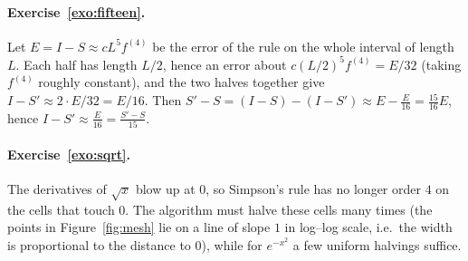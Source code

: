 \documentclass[11pt,a4paper,twoside,openright]{book}
\newcounter{exo}[chapter]
\begin{document}
\paragraph{Exercise~\ref{exo:fifteen}.}
Let $E=I-S\approx cL^{5}f^{(4)}$ be the error of the rule on the whole interval of length $L$. Each half has length $L/2$, hence an error about $c(L/2)^{5}f^{(4)}=E/32$ (taking $f^{(4)}$ roughly constant), and the two halves together give $I-S'\approx2\cdot E/32=E/16$. Then $S'-S=(I-S)-(I-S')\approx E-\frac E{16}=\frac{15}{16}E$, hence $I-S'\approx\frac E{16}=\frac{S'-S}{15}$.

\paragraph{Exercise~\ref{exo:sqrt}.}
The derivatives of $\sqrt{x}$ blow up at $0$, so Simpson's rule has no longer order $4$ on the cells that touch $0$. The algorithm must halve these cells many times (the points in Figure~\ref{fig:mesh} lie on a line of slope $1$ in log--log scale, i.e.\ the width is proportional to the distance to $0$), while for $e^{-x^{2}}$ a few uniform halvings suffice.

\backmatter
\printbibliography[heading=bibintoc]

\cleardoublepage
{}
{}
\printindex
\end{document}
